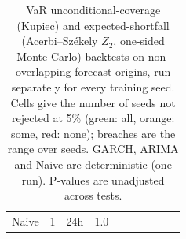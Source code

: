 \begin{table}[ht]
\begin{tabular}{l c c c cc cc cc}
Naive & 1 & 24h & 1.0%
\bottomrule
\end{tabular}
\caption{VaR unconditional-coverage (Kupiec) and expected-shortfall (Acerbi--Sz\'ekely $Z_2$, one-sided Monte Carlo) backtests on non-overlapping forecast origins, run separately for every training seed. Cells give the number of seeds not rejected at 5\% (green: all, orange: some, red: none); breaches are the range over seeds. GARCH, ARIMA and Naive are deterministic (one run). P-values are unadjusted across tests.}
\label{tab:var_es_backtests_seeds}
\end{table}
